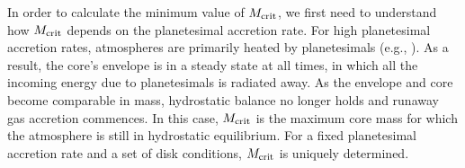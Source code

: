 \documentclass[apj]{emulateapj}
\begin{document}






In order to calculate the minimum value of $M_{\rm crit}$, we first need to understand how $M_{\rm crit}$ depends on the planetesimal accretion rate.
For high planetesimal accretion rates, atmospheres are primarily heated by planetesimals (e.g., \citealt{rafikov06}). As a result, the core's envelope is in a steady state at all times, in which all the incoming energy due to planetesimals is radiated away.  As the envelope and core become comparable in mass, hydrostatic balance no longer holds and runaway gas accretion commences. In this case, $M_{\rm crit}$ is the maximum core mass for which the atmosphere is still in hydrostatic equilibrium. For a fixed planetesimal accretion rate and a set of disk conditions, $M_{\rm crit}$ is uniquely determined. 
\end{document}
